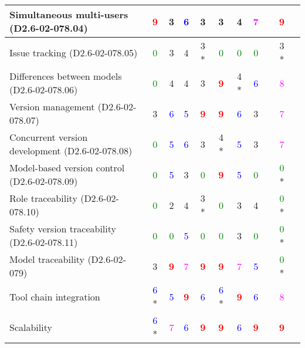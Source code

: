 \begin{tabular}{|l | c | c | c | c | c | c | c | c | c | c |}
\hline
Simultaneous multi-users (D2.6-02-078.04)   & \textcolor{red}{\textbf{9}} & 3    & \textcolor{blue}{6} & 3    & 3    & 4    & \textcolor{magenta}{7} & & \textcolor{red}{\textbf{9}} & \\
\hline
Issue tracking (D2.6-02-078.05)  & \textcolor{green}{0} & 3    & 4    & 3   * & \textcolor{green}{0} & \textcolor{green}{0} & \textcolor{green}{0} & & 3   * & \\
\hline
Differences between models (D2.6-02-078.06)  & \textcolor{green}{0} & 4    & 4    & 3    & \textcolor{red}{\textbf{9}} & 4   * & \textcolor{blue}{6} & & \textcolor{magenta}{8} & \\
\hline
Version management (D2.6-02-078.07)  & 3    & \textcolor{blue}{6} & \textcolor{blue}{5} & \textcolor{red}{\textbf{9}} & \textcolor{red}{\textbf{9}} & \textcolor{blue}{6} & 3    & & \textcolor{magenta}{7} & \\
\hline
Concurrent version development (D2.6-02-078.08)  & \textcolor{green}{0} & \textcolor{blue}{5} & \textcolor{blue}{6} & 3    & 4   * & \textcolor{blue}{5} & 3    & & \textcolor{magenta}{7} & \\
\hline
Model-based version control (D2.6-02-078.09)  & \textcolor{green}{0} & \textcolor{blue}{5} & 3    & \textcolor{green}{0} & \textcolor{red}{\textbf{9}} & \textcolor{blue}{5} & \textcolor{green}{0} & & \textcolor{green}{0} * & \\
\hline
Role traceability (D2.6-02-078.10)  & \textcolor{green}{0} & 2    & 4    & 3   * & \textcolor{green}{0} & 3    & 4    & & \textcolor{green}{0} * & \\
\hline
Safety version traceability (D2.6-02-078.11)  & \textcolor{green}{0} & \textcolor{green}{0} & \textcolor{blue}{5} & \textcolor{green}{0} & \textcolor{green}{0} & 3    & \textcolor{green}{0} & & \textcolor{green}{0} * & \\
\hline
Model traceability (D2.6-02-079) & 3    & \textcolor{red}{\textbf{9}} & \textcolor{magenta}{7} & \textcolor{red}{\textbf{9}} & \textcolor{red}{\textbf{9}} & \textcolor{magenta}{7} & \textcolor{blue}{5} & & \textcolor{green}{0} * & \\
\hline
Tool chain integration  & \textcolor{blue}{6} * & \textcolor{blue}{5} & \textcolor{red}{\textbf{9}} & \textcolor{blue}{6} & \textcolor{blue}{6} * & \textcolor{red}{\textbf{9}} & \textcolor{blue}{6} & & \textcolor{magenta}{8} & \\
\hline
Scalability  & \textcolor{blue}{6} * & \textcolor{magenta}{7} & \textcolor{blue}{6} & \textcolor{red}{\textbf{9}} & \textcolor{red}{\textbf{9}} & \textcolor{blue}{6} & \textcolor{red}{\textbf{9}} & & \textcolor{red}{\textbf{9}} & \\
\hline
\end{tabular}

